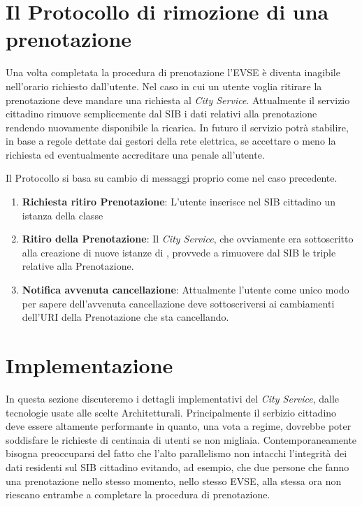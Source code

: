 \section{Il Protocollo di rimozione di una prenotazione}

Una volta completata la procedura di prenotazione l'EVSE è diventa inagibile nell'orario richiesto dall'utente. Nel caso in cui un utente voglia ritirare la prenotazione deve mandare una richiesta al \emph{City Service}. Attualmente il servizio cittadino rimuove semplicemente dal SIB i dati relativi alla prenotazione rendendo nuovamente disponibile la ricarica. In futuro il servizio potrà stabilire, in base a regole dettate dai gestori della rete elettrica, se accettare o meno la richiesta ed eventualmente accreditare una penale all'utente.

Il Protocollo si basa su cambio di messaggi proprio come nel caso precedente.

\begin{enumerate}
	\item \textbf{Richiesta ritiro Prenotazione}: L'utente inserisce nel SIB cittadino un istanza della classe  
	\item \textbf{Ritiro della Prenotazione}: Il \emph{City Service}, che ovviamente era sottoscritto alla creazione di nuove istanze di , provvede a rimuovere dal SIB le triple relative alla Prenotazione.
	\item \textbf{Notifica avvenuta cancellazione}: Attualmente l'utente come unico modo per sapere dell'avvenuta cancellazione deve sottoscriversi ai cambiamenti dell'URI della Prenotazione che sta cancellando.
\end{enumerate}

\section{Implementazione}\label{sec:impl}

In questa sezione discuteremo i dettagli implementativi del \emph{City Service}, dalle tecnologie usate alle scelte Architetturali. Principalmente il serbizio cittadino deve essere altamente performante in quanto, una vota a regime, dovrebbe poter soddisfare le richieste di centinaia di utenti se non migliaia. Contemporaneamente bisogna preoccuparsi del fatto che l'alto parallelismo non intacchi l'integrità dei dati residenti sul SIB cittadino evitando, ad esempio, che due persone che fanno una prenotazione nello stesso momento, nello stesso EVSE, alla stessa ora non riescano entrambe a completare la procedura di prenotazione. 

